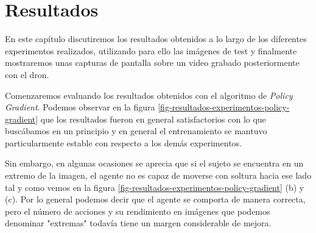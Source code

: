 \cleardoublepage

\chapter{Resultados}
\label{resultados}

En este capítulo discutiremos los resultados obtenidos a lo largo de los diferentes experimentos realizados, utilizando para ello las imágenes de test y finalmente mostraremos unas capturas de pantalla sobre un video grabado posteriormente con el dron.
\medskip

Comenzaremos evaluando los resultados obtenidos con el algoritmo de \textit{Policy Gradient}. Podemos observar en la figura \ref{fig-resultados-experimentos-policy-gradient} que los resultados fueron en general satisfactorios con lo que buscábamos en un principio y en general el entrenamiento se mantuvo particularmente estable con respecto a los demás experimentos.
\medskip

Sin embargo, en algunas ocasiones se aprecia que si el sujeto se encuentra en un extremo de la imagen, el agente no es capaz de moverse con soltura hacia ese lado tal y como vemos en la figura \ref{fig-resultados-experimentos-policy-gradient} (b) y (c). Por lo general podemos decir que el agente se comporta de manera correcta, pero el número de acciones y su rendimiento en imágenes que podemos denominar "extremas" todavía tiene un margen considerable de mejora.
\medskip

